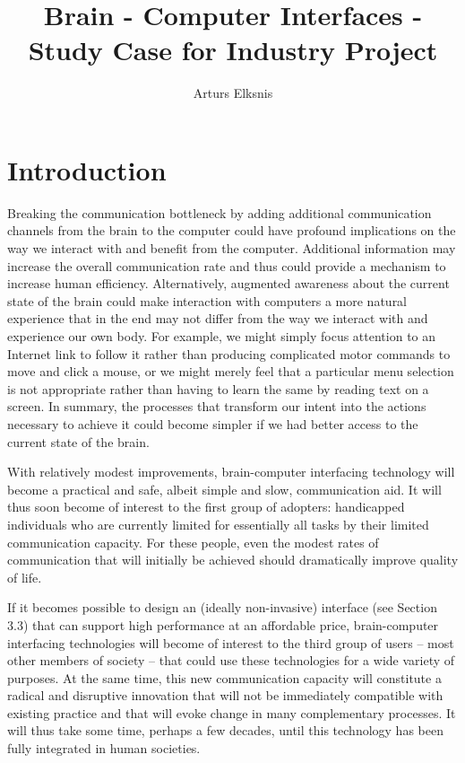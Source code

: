 \documentclass[fleqn,11pt]{olplainarticle}
\title{Brain - Computer Interfaces - Study Case for Industry Project}
\author[1]{Arturs Elksnis}
\begin{document}
\flushbottom
\maketitle
\thispagestyle{empty}

\section*{Introduction}
Breaking the communication bottleneck by adding additional communication channels from the brain to the computer could have profound implications on the way we interact with and benefit from the computer. Additional information may increase the overall communication rate and thus could provide a mechanism to increase human efficiency. Alternatively, augmented awareness about the current state of the brain could make interaction with computers a more natural experience that in the end may not differ from the way we interact with and experience our own body. For example, we might simply focus attention to an Internet link to follow it rather than producing complicated motor commands to move and click a mouse, or we might merely feel that a particular menu selection is not appropriate rather than having to learn the same by reading text on a screen. In summary, the processes that transform our intent into the actions necessary to achieve it could become simpler if we had better access to the current state of the brain. \cite{schalk2008brain}

With relatively modest improvements, brain-computer interfacing technology will become a practical and safe, albeit simple and slow, communication aid. It will thus soon become of interest to the first group of adopters: handicapped individuals who are currently limited for essentially all tasks by their limited communication capacity. For these people, even the modest rates of communication that will initially be achieved should dramatically improve quality of life.\cite{schalk2008brain}

If it becomes possible to design an (ideally non-invasive) interface (see Section 3.3) that can support high performance at an affordable price, brain-computer interfacing technologies will become of interest to the third group of users – most other members of society – that could use these technologies for a wide variety of purposes. At the same time, this new communication capacity will constitute a radical and disruptive innovation that will not be immediately compatible with existing practice and that will evoke change in many complementary processes. It will thus take some time, perhaps a few decades, until this technology has been fully integrated in human societies.
\end{document}
